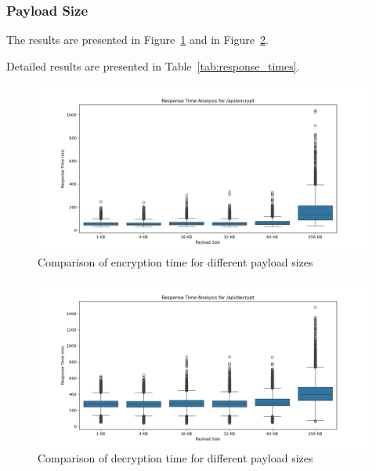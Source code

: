 \documentclass[cic,tc,english]{iiufrgs}
\begin{document}
            \subsubsection{Payload Size}
                The results are presented in Figure~\ref{fig:encrypt_payload_size} and in Figure~\ref{fig:decrypt_payload_size}.

                Detailed results are presented in Table~\ref{tab:response_times}.

                \begin{figure}
                    \centering
                    \includegraphics[width=\textwidth]{images/phase2/response_time_api_encrypt.png}
                    \caption{Comparison of encryption time for different payload sizes}
                    \label{fig:encrypt_payload_size}
                \end{figure}

                \begin{figure}
                    \centering
                    \includegraphics[width=\textwidth]{images/phase2/response_time_api_decrypt.png}
                    \caption{Comparison of decryption time for different payload sizes}
                    \label{fig:decrypt_payload_size}
                \end{figure}
\end{document}
